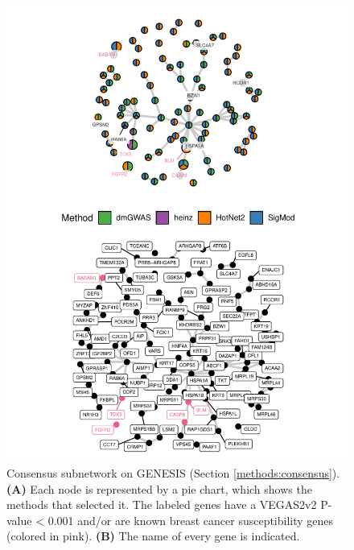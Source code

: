 \documentclass[
  11pt,
]{env/yjiao}
\begin{document}
\begin{figure}

{\centering \includegraphics[height=0.8\textheight]{fig/sfigure_7} 

}

\caption{Consensus subnetwork on GENESIS (Section \ref{methods:consensus}). \textbf{(A)} Each node is represented by a pie chart, which shows the methods that selected it. The labeled genes have a VEGAS2v2 P-value \textless{} 0.001 and/or are known breast cancer susceptibility genes (colored in pink). \textbf{(B)} The name of every gene is indicated.}\label{fig:consensus-names}
\end{figure}
\end{document}

